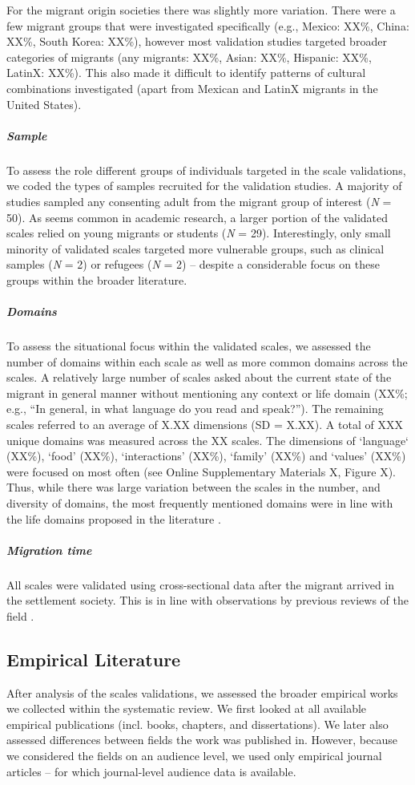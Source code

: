 \documentclass[man, 12pt, a4paper]{apa7}
\begin{document}
For the migrant origin societies there was slightly more variation. There were a few migrant groups that were investigated specifically (e.g., Mexico: XX\%, China: XX\%, South Korea: XX\%), however most validation studies targeted broader categories of migrants (any migrants: XX\%, Asian: XX\%, Hispanic: XX\%, LatinX: XX\%). This also made it difficult to identify patterns of cultural combinations investigated (apart from Mexican and LatinX migrants in the United States).

\subparagraph{Sample}
To assess the role different groups of individuals targeted in the scale validations, we coded the types of samples recruited for the validation studies. A majority of studies sampled any consenting adult from the migrant group of interest (\textit{N} = 50). As seems common in academic research, a larger portion of the validated scales relied on young migrants or students (\textit{N} = 29). Interestingly, only small minority of validated scales targeted more vulnerable groups, such as clinical samples (\textit{N} = 2) or refugees (\textit{N} = 2) -- despite a considerable focus on these groups within the broader literature.

\subparagraph{Domains}
To assess the situational focus within the validated scales, we assessed the number of domains within each scale as well as more common domains across the scales. A relatively large number of scales asked about the current state of the migrant in general manner without mentioning any context or life domain (XX\%; e.g., ``In general, in what language do you read and speak?''). The remaining scales referred to an average of X.XX dimensions (SD = X.XX). A total of XXX unique domains was measured across the XX scales. The dimensions of `language‘ (XX\%), `food' (XX\%), `interactions’ (XX\%), `family' (XX\%) and `values' (XX\%) were focused on most often (see Online Supplementary Materials X, Figure X). Thus, while there was large variation between the scales in the number, and diversity of domains, the most frequently mentioned domains were in line with the life domains proposed in the literature \citep[e.g.,][]{Arends-Toth2007}.
\vspace{1em}

\subparagraph{Migration time}
All scales were validated using cross-sectional data after the migrant arrived in the settlement society. This is in line with observations by previous reviews of the field \citep[e.g.,][]{Brown2011}.

\subsection{Empirical Literature}
After analysis of the scales validations, we assessed the broader empirical works we collected within the systematic review. We first looked at all available empirical publications (incl. books, chapters, and dissertations). We later also assessed differences between fields the work was published in. However, because we considered the fields on an audience level, we used only empirical journal articles -- for which journal-level audience data is available.
\end{document}
